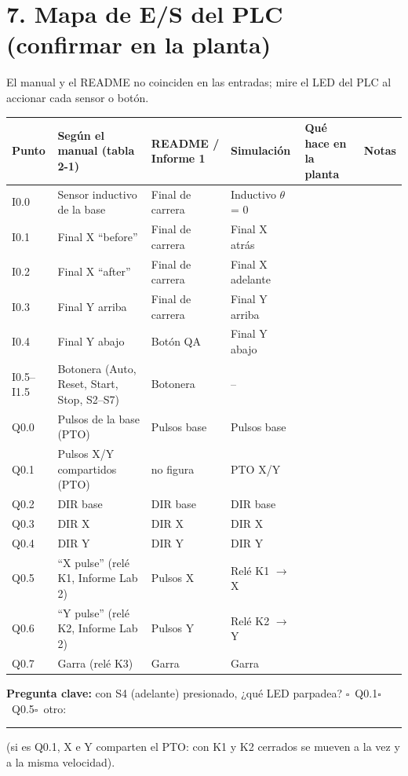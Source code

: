 \documentclass[10pt]{article}
\newcommand{\cajita}{$\square$}
\begin{document}
\section{7. Mapa de E/S del PLC (confirmar en la planta)}
El manual y el README no coinciden en las entradas; mire el LED del PLC al accionar cada sensor o botón.
{\small
\begin{longtable}{@{}L{1.4cm}L{5.2cm}L{3.6cm}L{3.4cm}>{}L{6.2cm}L{3.6cm}@{}}
\toprule
\textbf{Punto} & \textbf{Según el manual (tabla 2-1)} & \textbf{README / Informe 1} & \textbf{Simulación} & \textbf{Qué hace en la planta} & \textbf{Notas}\\
\midrule\endhead
\bottomrule\endfoot
I0.0 & Sensor inductivo de la base & Final de carrera & Inductivo $\theta$ = 0 & & \\
I0.1 & Final X ``before'' & Final de carrera & Final X atrás & & \\
I0.2 & Final X ``after'' & Final de carrera & Final X adelante & & \\
I0.3 & Final Y arriba & Final de carrera & Final Y arriba & & \\
I0.4 & Final Y abajo & Botón QA & Final Y abajo & & \\
I0.5--I1.5 & Botonera (Auto, Reset, Start, Stop, S2--S7) & Botonera & -- & & \\
Q0.0 & Pulsos de la base (PTO) & Pulsos base & Pulsos base & & \\
Q0.1 & Pulsos X/Y compartidos (PTO) & no figura & PTO X/Y & & \\
Q0.2 & DIR base & DIR base & DIR base & & \\
Q0.3 & DIR X & DIR X & DIR X & & \\
Q0.4 & DIR Y & DIR Y & DIR Y & & \\
Q0.5 & ``X pulse'' (relé K1, Informe Lab 2) & Pulsos X & Relé K1 $\rightarrow$ X & & \\
Q0.6 & ``Y pulse'' (relé K2, Informe Lab 2) & Pulsos Y & Relé K2 $\rightarrow$ Y & & \\
Q0.7 & Garra (relé K3) & Garra & Garra & & \\
\end{longtable}}
\noindent\textbf{Pregunta clave:} con S4 (adelante) presionado, ¿qué LED parpadea? \cajita\ Q0.1\quad \cajita\ Q0.5\quad \cajita\ otro: \rule{3cm}{0.4pt}
(si es Q0.1, X e Y comparten el PTO: con K1 y K2 cerrados se mueven a la vez y a la misma velocidad).

\newpage
\end{document}

